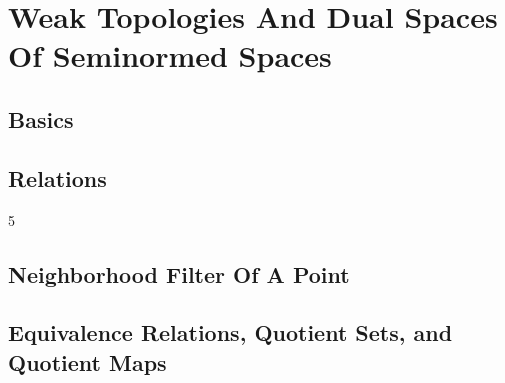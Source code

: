 \section{Weak Topologies And Dual Spaces Of Seminormed Spaces}

\subsection{Basics}



\subsection{Relations}






5












\subsection{Neighborhood Filter Of A Point}




\subsection{Equivalence Relations, Quotient Sets, and Quotient Maps}

 

 



